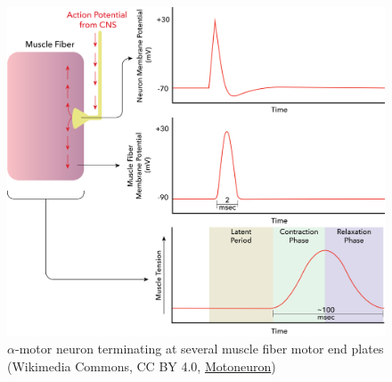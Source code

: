 \begin{figure}[!ht]
    \centering
    \includegraphics[width=1\linewidth]{./figure/eac-latency.png}
    \caption{$\alpha$-motor neuron terminating at several muscle fiber motor end plates \footnotesize{(Wikimedia Commons, CC BY 4.0, \href{https://commons.wikimedia.org/wiki/File:Motoneuron.png}{Motoneuron})}}
    \label{fig:Motoneuron}
\end{figure}

\printbibliography[heading=subbibintoc]



